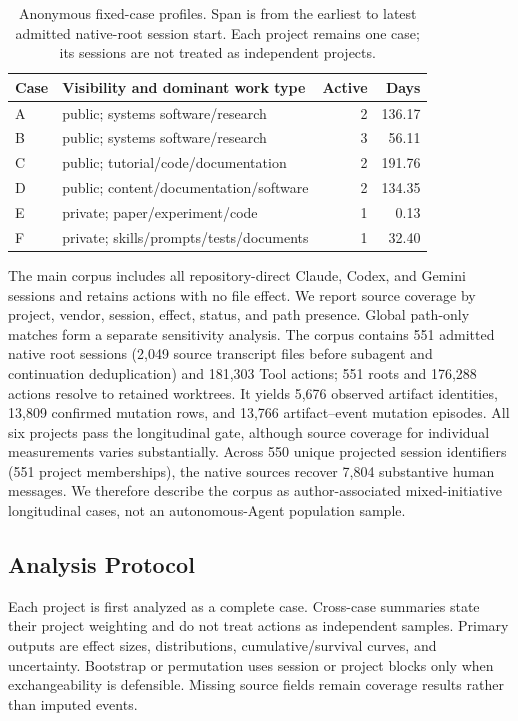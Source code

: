 \documentclass[letterpaper]{article}
\begin{document}
\begin{table}[t]
\centering
\footnotesize
\setlength{\tabcolsep}{3pt}
\begin{tabular}{@{}llrr@{}}
\toprule
Case & Visibility and dominant work type & Active & Days \\
\midrule
A & public; systems software/research & 2 & 136.17 \\
B & public; systems software/research & 3 & 56.11 \\
C & public; tutorial/code/documentation & 2 & 191.76 \\
D & public; content/documentation/software & 2 & 134.35 \\
E & private; paper/experiment/code & 1 & 0.13 \\
F & private; skills/prompts/tests/documents & 1 & 32.40 \\
\bottomrule
\end{tabular}
\caption{Anonymous fixed-case profiles.  Span is from the earliest to latest
admitted native-root session start.  Each project remains one case; its
sessions are not treated as independent projects.}
\label{tab:cases}
\end{table}

The main corpus includes all repository-direct Claude, Codex, and Gemini
sessions and retains actions with no file effect.  We report source coverage by
project, vendor, session, effect, status, and path presence.  Global path-only
matches form a separate sensitivity analysis.  The corpus contains
551 admitted native root sessions (2,049 source transcript files before
subagent and continuation deduplication) and 181,303 Tool actions; 551 roots
and 176,288 actions resolve to retained worktrees.  It yields 5,676 observed
artifact identities, 13,809 confirmed mutation rows, and 13,766
artifact--event mutation episodes.  All six projects pass
the longitudinal gate, although source coverage for individual measurements
varies substantially.
Across 550 unique projected session identifiers (551 project memberships),
the native sources recover 7,804 substantive human messages.  We therefore
describe the corpus as author-associated mixed-initiative longitudinal cases,
not an autonomous-Agent population sample.

\subsection{Analysis Protocol}

Each project is first analyzed as a complete case.  Cross-case summaries state
their project weighting and do not treat actions as independent samples.
Primary outputs are effect sizes, distributions, cumulative/survival curves,
and uncertainty.  Bootstrap or permutation uses session or project blocks only
when exchangeability is defensible.  Missing source fields remain coverage
results rather than imputed events.
\end{document}
